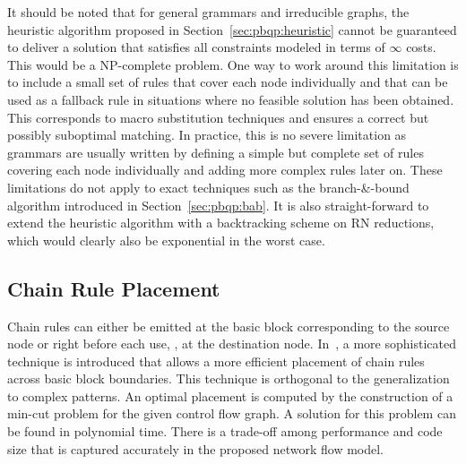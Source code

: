 It should be noted that for general grammars and irreducible graphs,
the heuristic algorithm proposed in Section~\ref{sec:pbqp:heuristic}
cannot be guaranteed to deliver a solution that satisfies all
constraints modeled in terms of $\infty$ costs. This would be a
NP-complete problem. One way to work around this limitation is to
include a small set of rules that cover each node individually and
that can be used as a fallback rule in situations where no feasible
solution has been obtained. This corresponds to macro substitution
techniques and ensures a correct but possibly suboptimal matching. In
practice, this is no severe limitation as grammars are usually written
by defining a simple but complete set of rules covering each node
individually and adding more complex rules later on. These limitations
do not apply to exact techniques such as the branch-\&-bound algorithm
introduced in Section~\ref{sec:pbqp:bab}. It is also straight-forward
to extend the heuristic algorithm with a backtracking scheme on RN
reductions, which would clearly also be exponential in the worst case.

\subsection{Chain Rule Placement}
\label{sec:chain_rule_placement}
Chain rules can either be emitted at the basic block corresponding to
the source node or right before each use, \ie, at the destination
node. In~\cite{1269857}, a more sophisticated technique is introduced
that allows a more efficient placement of chain rules across basic
block boundaries. This technique is orthogonal to the generalization
to complex patterns. An optimal placement is computed by the
construction of a min-cut problem for the given control flow graph. A
solution for this problem can be found in polynomial time. There is a
trade-off among performance and code size that is captured accurately
in the proposed network flow model.

